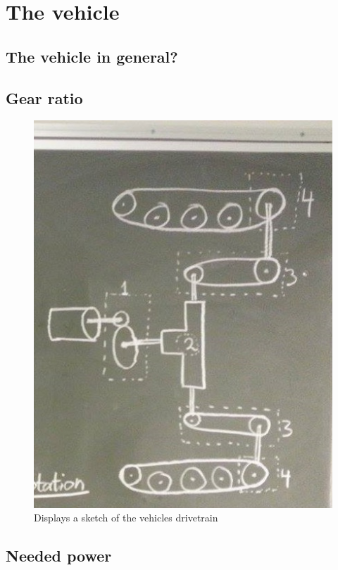 \section{The vehicle}

\subsection{The vehicle in general?}

\subsection{Gear ratio}


 \begin{figure}[H]
	\centering
	\includegraphics[scale=0.8]{figures/Drivetrain.jpg}
	\caption{Displays a sketch of the vehicles drivetrain}
	\label{fig:Drivetrain}
\end{figure}

\subsection{Needed power}


